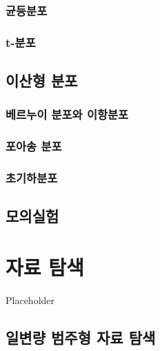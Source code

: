 \documentclass[
]{book}
\begin{document}
\hypertarget{uxade0uxb4f1uxbd84uxd3ec}{%
\subsection{균등분포}\label{uxade0uxb4f1uxbd84uxd3ec}}

\hypertarget{t-uxbd84uxd3ec}{%
\subsection{t-분포}\label{t-uxbd84uxd3ec}}

\hypertarget{uxc774uxc0b0uxd615-uxbd84uxd3ec}{%
\section{이산형 분포}\label{uxc774uxc0b0uxd615-uxbd84uxd3ec}}

\hypertarget{uxbca0uxb974uxb204uxc774-uxbd84uxd3ecuxc640-uxc774uxd56duxbd84uxd3ec}{%
\subsection{베르누이 분포와 이항분포}\label{uxbca0uxb974uxb204uxc774-uxbd84uxd3ecuxc640-uxc774uxd56duxbd84uxd3ec}}

\hypertarget{uxd3ecuxc544uxc1a1-uxbd84uxd3ec}{%
\subsection{포아송 분포}\label{uxd3ecuxc544uxc1a1-uxbd84uxd3ec}}

\hypertarget{uxcd08uxae30uxd558uxbd84uxd3ec}{%
\subsection{초기하분포}\label{uxcd08uxae30uxd558uxbd84uxd3ec}}

\hypertarget{uxbaa8uxc758uxc2e4uxd5d8}{%
\section{모의실험}\label{uxbaa8uxc758uxc2e4uxd5d8}}

\hypertarget{chapter-EDA}{%
\chapter{자료 탐색}\label{chapter-EDA}}

Placeholder

\hypertarget{uxc77cuxbcc0uxb7c9-uxbc94uxc8fcuxd615-uxc790uxb8cc-uxd0d0uxc0c9}{%
\section{일변량 범주형 자료 탐색}\label{uxc77cuxbcc0uxb7c9-uxbc94uxc8fcuxd615-uxc790uxb8cc-uxd0d0uxc0c9}}
\end{document}
